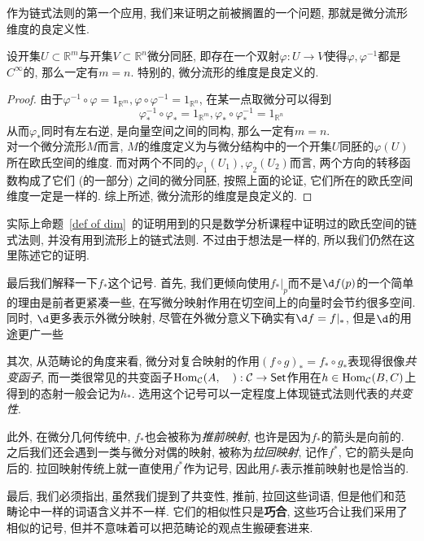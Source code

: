 作为链式法则的第一个应用, 我们来证明之前被搁置的一个问题, 那就是微分流形维度的良定义性.
\begin{prop}\label{def of dim}
    设开集$U\subset\mathbb{R}^m$与开集$V\subset\mathbb{R}^n$微分同胚, 即存在一个双射$\varphi:U\to V$使得$\varphi,\varphi^{-1}$都是$C^\infty$的, 那么一定有$m=n$.
    特别的, 微分流形的维度是良定义的.
\end{prop}
\begin{proof}
    由于$\varphi^{-1}\circ\varphi=1_{\mathbb{R}^m},\varphi\circ\varphi^{-1}=1_{\mathbb{R}^n}$, 在某一点取微分可以得到
    \[\varphi^{-1}_*\circ\varphi_*=1_{\mathbb{R}^m},\varphi_*\circ\varphi^{-1}_*=1_{\mathbb{R}^n}\]
    从而$\varphi_*$同时有左右逆, 是向量空间之间的同构, 那么一定有$m=n$.\\
    对一个微分流形$M$而言, $M$的维度定义为与微分结构中的一个开集$U$同胚的$\varphi(U)$所在欧氏空间的维度.
    而对两个不同的$\varphi_1(U_1),\varphi_2(U_2)$而言, 两个方向的转移函数构成了它们 (的一部分) 之间的微分同胚, 按照上面的论证, 它们所在的欧氏空间维度一定是一样的.
    综上所述, 微分流形的维度是良定义的.
\end{proof}

\begin{rem}
    实际上命题~\ref{def of dim}~的证明用到的只是数学分析课程中证明过的欧氏空间的链式法则, 并没有用到流形上的链式法则.
    不过由于想法是一样的, 所以我们仍然在这里陈述它的证明.
\end{rem}

\begin{rem}
    最后我们解释一下$f_*$这个记号.
    首先, 我们更倾向使用$f_*|_p$而不是$\d f(p)$的一个简单的理由是前者更紧凑一些, 在写微分映射作用在切空间上的向量时会节约很多空间.
    同时, $\d$更多表示外微分映射, 尽管在外微分意义下确实有$\d f=f|_*$, 但是$\d$的用途更广一些

    其次, 从范畴论的角度来看, 微分对复合映射的作用$(f\circ g)_*=f_*\circ g_*$表现得很像\textit{共变函子}, 而一类很常见的共变函子$\operatorname{Hom}_{\mathcal{C}}(A,\quad):\mathcal{C}\to\mathsf{Set}$作用在$h\in\operatorname{Hom}_{\mathcal{C}}(B,C)$上得到的态射一般会记为$h_*$.
    选用这个记号可以一定程度上体现链式法则代表的\textit{共变性}.

    此外, 在微分几何传统中, $f_*$也会被称为\textit{推前映射}, 也许是因为$f_*$的箭头是向前的.
    之后我们还会遇到一类与微分对偶的映射, 被称为\textit{拉回映射}, 记作$f^*$, 它的箭头是向后的.
    拉回映射传统上就一直使用$f^*$作为记号, 因此用$f_*$表示推前映射也是恰当的.  

    最后, 我们必须指出, 虽然我们提到了共变性, 推前, 拉回这些词语, 但是他们和范畴论中一样的词语含义并不一样.
    它们的相似性只是\textbf{巧合}, 这些巧合让我们采用了相似的记号, 但并不意味着可以把范畴论的观点生搬硬套进来.
\end{rem}

